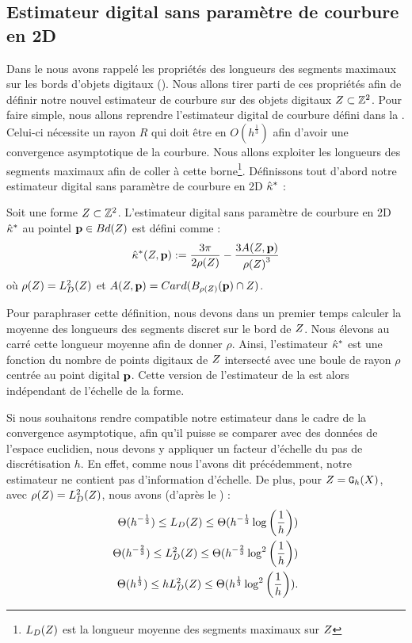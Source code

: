 \subsection{Estimateur digital sans paramètre de courbure en 2D}
%
Dans le  nous avons rappelé les propriétés des longueurs
des segments maximaux sur les bords d'objets digitaux
(). Nous allons tirer parti de ces propriétés afin
de définir notre nouvel estimateur de courbure sur des objets digitaux
$Z \subset \mathbb{Z}^2$. Pour faire simple, nous allons reprendre l'estimateur
digital de courbure défini dans la .
Celui-ci nécessite un rayon $R$ qui doit être en $O(h^{\frac{1}{3}})$ afin
d'avoir une convergence asymptotique de la courbure. Nous allons exploiter les
longueurs des segments maximaux afin de coller à cette
borne\footnote{$L_D({Z})$ est la longueur moyenne des segments maximaux
sur $Z$}. Définissons tout d'abord notre estimateur digital sans
paramètre de courbure en 2D $\hat{\kappa}^{*}$ :
%
\begin{definition}
  \label{def:curvature-estimator-2d-pf}
  Soit une forme $Z \subset \mathbb{Z}^2$. L'estimateur digital sans paramètre
  de courbure en 2D $\hat{\kappa}^{*}$ au pointel $\mathbf{p} \in Bd({Z})$ est défini comme :
  \begin{equation}
    \hat{\kappa}^{*}( Z, \mathbf{p}) := \frac{3\pi}{2 \rho(Z)} - \frac{3 A(Z,\mathbf{p})}{{\rho(Z)}^3}
  \end{equation}
  où $\rho(Z) =L_D^2(Z)$ et $A(Z,\mathbf{p}) =
  Card(B_{\rho(Z)}(\mathbf{p}) \cap Z)$.
\end{definition}
%
Pour paraphraser cette définition, nous devons dans un premier temps calculer la
moyenne des longueurs des segments discret sur le bord de $Z$. Nous
élevons au carré cette longueur moyenne afin de donner $\rho$. Ainsi,
l'estimateur $\hat{\kappa}^{*}$ est une fonction du nombre de points digitaux de
$Z$ intersecté avec une boule de rayon $\rho$ centrée au point digital
$\mathbf{p}$. Cette version de l'estimateur de la
 est alors indépendant de l’échelle de la
forme.


Si nous souhaitons rendre compatible notre estimateur dans le cadre de la
convergence asymptotique, afin qu'il puisse se comparer avec des données de
l'espace euclidien, nous devons y appliquer un facteur d'échelle du pas de
discrétisation $h$. En effet, comme nous l'avons dit précédemment, notre
estimateur ne contient pas d'information d'échelle. De plus, pour $Z =
\mathtt{G}_{h}(X)$, avec $\rho(Z) = L^2_D(Z)$, nous avons (d'après le
) :
%
\begin{align}
  \Theta(h^{-\frac{1}{3}}) \le L_D( Z ) \le \Theta(h^{-\frac{1}{3}} \log \left(\frac{1}{h}\right)) \\
  \Theta(h^{-\frac{2}{3}}) \le L^2_D( Z ) \le \Theta(h^{-\frac{2}{3}} \log^2 \left(\frac{1}{h}\right)) \\
  \Theta(h^{\frac{1}{3}}) \le hL^2_D( Z ) \le \Theta(h^{\frac{1}{3}} \log^2 \left(\frac{1}{h}\right)) \label{eq:bounds-length-MDSS}.
\end{align}
%


